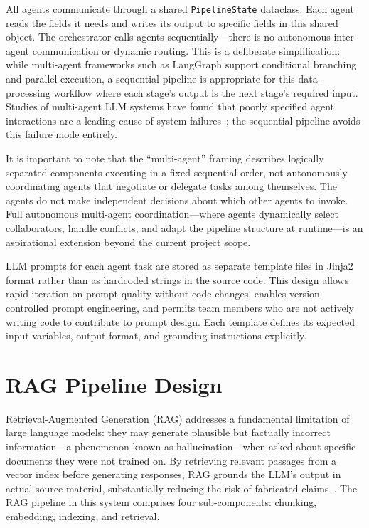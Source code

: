 \documentclass[12pt,a4paper]{article}
\begin{document}
All agents communicate through a shared \texttt{PipelineState} dataclass. Each agent reads the fields it needs and writes its output to specific fields in this shared object. The orchestrator calls agents sequentially---there is no autonomous inter-agent communication or dynamic routing. This is a deliberate simplification: while multi-agent frameworks such as LangGraph support conditional branching and parallel execution, a sequential pipeline is appropriate for this data-processing workflow where each stage's output is the next stage's required input. Studies of multi-agent LLM systems have found that poorly specified agent interactions are a leading cause of system failures~\citep{guo2024multiagent}; the sequential pipeline avoids this failure mode entirely.

It is important to note that the ``multi-agent'' framing describes logically separated components executing in a fixed sequential order, not autonomously coordinating agents that negotiate or delegate tasks among themselves. The agents do not make independent decisions about which other agents to invoke. Full autonomous multi-agent coordination---where agents dynamically select collaborators, handle conflicts, and adapt the pipeline structure at runtime---is an aspirational extension beyond the current project scope.

LLM prompts for each agent task are stored as separate template files in Jinja2 format rather than as hardcoded strings in the source code. This design allows rapid iteration on prompt quality without code changes, enables version-controlled prompt engineering, and permits team members who are not actively writing code to contribute to prompt design. Each template defines its expected input variables, output format, and grounding instructions explicitly.

\section{RAG Pipeline Design}

Retrieval-Augmented Generation (RAG) addresses a fundamental limitation of large language models: they may generate plausible but factually incorrect information---a phenomenon known as hallucination---when asked about specific documents they were not trained on. By retrieving relevant passages from a vector index before generating responses, RAG grounds the LLM's output in actual source material, substantially reducing the risk of fabricated claims~\citep{lewis2020rag}. The RAG pipeline in this system comprises four sub-components: chunking, embedding, indexing, and retrieval.
\end{document}
